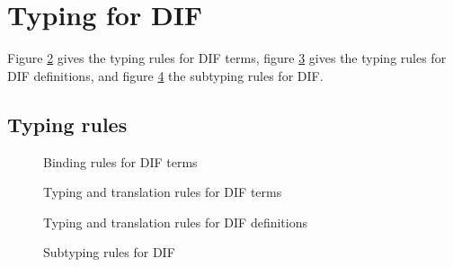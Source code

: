 \section{Typing for DIF}
Figure \ref{figure_typing_rules_terms} gives the typing rules for DIF terms,
figure \ref{figure_typing_rules_definitions} gives the typing rules for DIF
definitions, and figure \ref{figure_subtyping_rules} the subtyping rules for
DIF.

\subsection{Typing rules}

\begin{figure}[h]
    
    \caption{Binding rules for DIF terms}
    \label{figure_binding_rules}
\end{figure}

\begin{figure}[h]
    
    \caption{Typing and translation rules for DIF terms}
    \label{figure_typing_rules_terms}
\end{figure}

\begin{figure}[h]
    
    \caption{Typing and translation rules for DIF definitions}
    \label{figure_typing_rules_definitions}
\end{figure}

\begin{figure}[h]
    
    \caption{Subtyping rules for DIF}
    \label{figure_subtyping_rules}
\end{figure}
